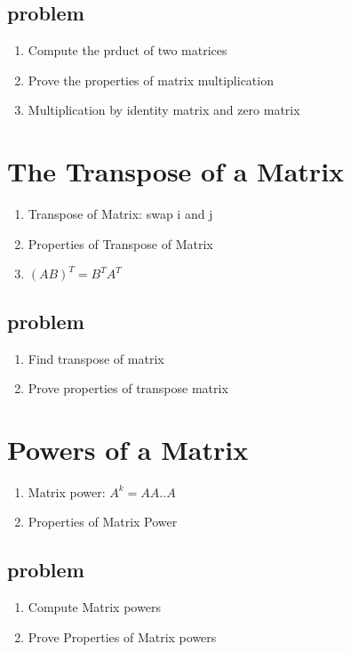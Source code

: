 \documentclass{article}
\begin{document}
\subsection{problem}

\begin{enumerate}
    \item Compute the prduct of two matrices
    \item Prove the properties of matrix multiplication
    \item Multiplication by identity matrix and zero matrix
\end{enumerate}

\section{The Transpose of a Matrix}

\begin{enumerate}
    \item Transpose of Matrix: swap i and j
    \item Properties of Transpose of Matrix
    \item $(AB)^T = B^T A^T $
\end{enumerate}

\subsection{problem}
\begin{enumerate}
    \item Find transpose of matrix
    \item Prove properties of transpose matrix
\end{enumerate}

\section{Powers of a Matrix}

\begin{enumerate}
    \item Matrix power: $ A^k = A A ..A $
    \item Properties of Matrix Power
\end{enumerate}

\subsection{problem}
\begin{enumerate}
    \item Compute Matrix powers
    \item Prove Properties of Matrix powers
\end{enumerate}
\end{document}
